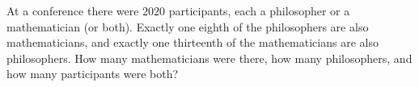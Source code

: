 At a conference there were $2020$ participants, each a philosopher or a mathematician (or both). Exactly one eighth of the philosophers are also mathematicians, and exactly one thirteenth of the mathematicians are also philosophers. How many mathematicians were there, how many philosophers, and how many participants were both?
